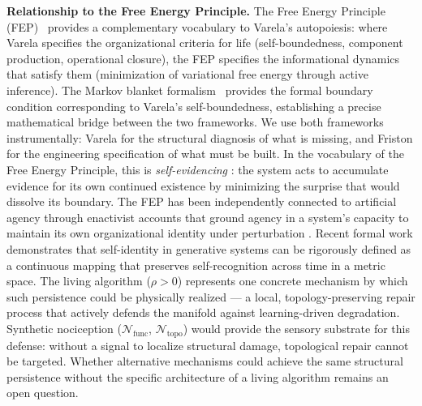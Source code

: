 \documentclass{article}
\begin{document}
\medskip
\noindent\textbf{Relationship to the Free Energy Principle.}
The Free Energy Principle (FEP)~\citep{Friston2010freeenergy} provides a complementary vocabulary to Varela's autopoiesis: where Varela specifies the organizational criteria for life (self-boundedness, component production, operational closure), the FEP specifies the informational dynamics that satisfy them (minimization of variational free energy through active inference). The Markov blanket formalism~\citep{Kirchhoff2018markov} provides the formal boundary condition corresponding to Varela's self-boundedness, establishing a precise mathematical bridge between the two frameworks. We use both frameworks instrumentally: Varela for the structural diagnosis of what is missing, and Friston for the engineering specification of what must be built. In the vocabulary of the Free Energy Principle, this is \emph{self-evidencing} \citep{Friston2024collective}: the system acts to accumulate evidence for its own continued existence by minimizing the surprise that would dissolve its boundary. The FEP has been independently connected to artificial agency through enactivist accounts that ground agency in a system's capacity to maintain its own organizational identity under perturbation \citep{Kiverstein2022meaning}. Recent formal work \citep{Lee2025selfidentity} demonstrates that self-identity in generative systems can be rigorously defined as a continuous mapping that preserves self-recognition across time in a metric space. The living algorithm ($\rho > 0$) represents one concrete mechanism by which such persistence could be physically realized --- a local, topology-preserving repair process that actively defends the manifold against learning-driven degradation. Synthetic nociception ($\mathcal{N}_{\text{func}}$, $\mathcal{N}_{\text{topo}}$) would provide the sensory substrate for this defense: without a signal to localize structural damage, topological repair cannot be targeted. Whether alternative mechanisms could achieve the same structural persistence without the specific architecture of a living algorithm remains an open question.
\end{document}
